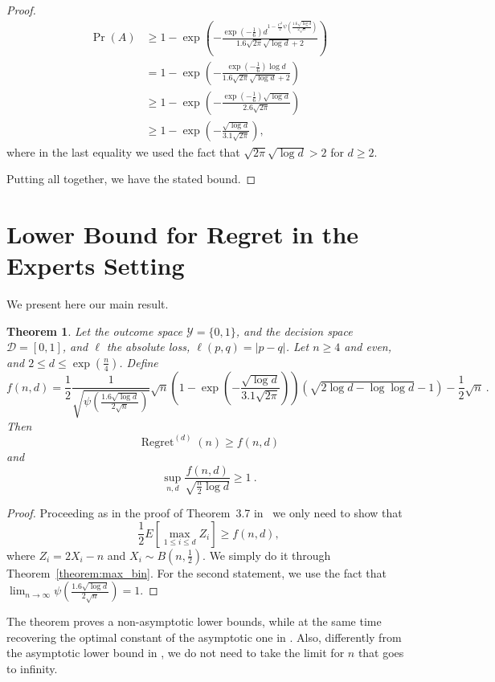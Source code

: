 \documentclass{article}
\DeclareMathOperator{\Regret}{Regret}
\newtheorem{theorem}{Theorem}
\begin{document}
\begin{proof}
\begin{align*}
\Pr(A)
& \ge 1 - \exp\left(-\frac{\exp\left(-\frac{1}{6}\right) d^{1-\frac{C^2}{2} \psi\left(\frac{1.6 \sqrt{\log d}}{2 \sqrt{n}}\right)}}{1.6 \sqrt{2\pi} \sqrt{\log d}+2}\right) \\
& = 1 - \exp\left(-\frac{\exp\left(-\frac{1}{6}\right) \log d}{1.6 \sqrt{2\pi} \sqrt{\log d}+2}\right) \\
& \ge 1 - \exp\left(-\frac{\exp\left(-\frac{1}{6}\right) \sqrt{\log d}}{2.6 \sqrt{2\pi}}\right)\\
& \ge 1 - \exp\left(-\frac{\sqrt{\log d}}{3.1 \sqrt{2\pi}}\right),
\end{align*}
where in the last equality we used the fact that $\sqrt{2\pi} \sqrt{\log d} > 2$ for $d\ge 2$.

Putting all together, we have the stated bound.
\end{proof}

\section{Lower Bound for Regret in the Experts Setting}
\label{section:experts}

We present here our main result.

\begin{theorem}
Let the outcome space $\mathcal{Y}=\{0,1\}$, and the decision space
$\mathcal{D}=[0,1]$, and $\ell$ the absolute loss, $\ell(p,q)=|p-q|$. Let $n
\ge 4$ and even, and $2\le d \le \exp(\frac{n}{4})$.  Define
\[
f(n,d)=\frac{1}{2}\frac{1}{\sqrt{\psi\left(\frac{1.6 \sqrt{\log d}}{2 \sqrt{n}}\right)}}\sqrt{n}\left(1 - \exp\left(-\frac{\sqrt{\log d}}{3.1 \sqrt{2\pi}}\right)\right) \left(\sqrt{2 \log d -\log \log d}-1\right) -\frac{1}{2}\sqrt{n}~.
\]
Then
\[
\Regret^{(d)}(n)\ge f(n,d)
\]
and
\[
\sup_{n,d} \frac{f(n,d)}{\sqrt{\frac{n}{2} \log d}} \ge 1~.
\]
\end{theorem}
%
\begin{proof}
Proceeding as in the proof of Theorem~3.7 in~\citep{Cesa-BianchiL06} we only need to show that
\[
\frac{1}{2} E\left[ \max_{1 \le i \le d} Z_i\right] \ge f(n,d),
\]
where $Z_i= 2 X_i - n$ and $X_i \sim B(n, \frac{1}{2})$. We simply do it through Theorem~\ref{theorem:max_bin}.
For the second statement, we use the fact that $\lim_{n \to \infty} \psi\left(\frac{1.6 \sqrt{\log d}}{2 \sqrt{n}}\right) = 1$.
\end{proof}

The theorem proves a non-asymptotic lower bounds, while at the same time
recovering the optimal constant of the asymptotic one in
\citet{Cesa-BianchiL06}. Also, differently from the asymptotic lower bound in
\citet{Cesa-BianchiL06}, we do not need to take the limit for $n$ that goes to
infinity.
\end{document}
